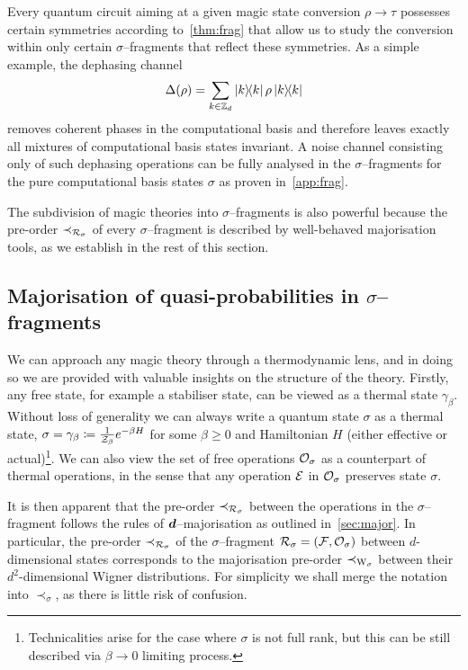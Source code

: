 \documentclass[pra,
aps,
twocolumn,
superscriptaddress,
groupedaddress,
nofootinbib,
reprint
]{revtex4-1}
\begin{document}
Every  quantum circuit aiming at a given magic state conversion $\rho \longrightarrow \tau$ possesses certain symmetries according to~\cref{thm:frag} that allow us to study the conversion within only certain $\sigma$--fragments that reflect these symmetries.
As a simple example, the dephasing channel
\begin{equation}\label{eq:dephase}
	\Delta(\rho) = \sum_{k \in \mathbb{Z}_d} \ketbra{k}{k}\rho\ketbra{k}{k}
\end{equation}
removes coherent phases in the computational basis and therefore leaves exactly all mixtures of computational basis states invariant.
A noise channel consisting only of such dephasing operations can be fully analysed in the $\sigma$--fragments for the pure computational basis states $\sigma$ as proven in~\cref{app:frag}.

The subdivision of magic theories into $\sigma$--fragments is also powerful because the pre-order $\prec_{\mathcal{R}_\sigma}$ of every $\sigma$--fragment is described by well-behaved majorisation tools, as we establish in the rest of this section.

\subsection{Majorisation of quasi-probabilities in $\sigma$--fragments}\label{sec:major_frag}

We can approach any magic theory through a thermodynamic lens, and in doing so we are provided with valuable insights on the structure of the theory. 
Firstly, any free state, for example a stabiliser state, can be viewed as a thermal state $\gamma_\beta$.
Without loss of generality we can always write a quantum state $\sigma$ as a thermal state, $\sigma = \gamma_\beta \coloneqq \frac{1}{\mathcal{Z}_\beta} e^{-\beta H}$ for some $\beta \geq 0$ and Hamiltonian $H$ (either effective or actual)\footnote{Technicalities arise for the case where $\sigma$ is not full rank, but this can be still described via $ \beta \rightarrow 0$ limiting process.}.
We can also view the set of free operations $\mathcal{O}_\sigma$ as a counterpart of thermal operations, in the sense that any operation $\mathcal{E}$ in $\mathcal{O}_\sigma$ preserves state $\sigma$. 

It is then apparent that the pre-order $\prec_{\mathcal{R}_\sigma}$ between the operations in the $\sigma$--fragment follows the rules of $\bm{d}$--majorisation as outlined in~\cref{sec:major}.
In particular, the pre-order $\prec_{\mathcal{R}_\sigma}$ of the $\sigma$--fragment $\mathcal{R}_\sigma = (\mathcal{F}, \mathcal{O}_\sigma)$ between $d$-dimensional states corresponds to the majorisation pre-order $\prec_{\W{\sigma}}$ between their $d^2$-dimensional Wigner distributions.
For simplicity we shall merge the notation into $\prec_\sigma$, as there is little risk of confusion.
\end{document}
